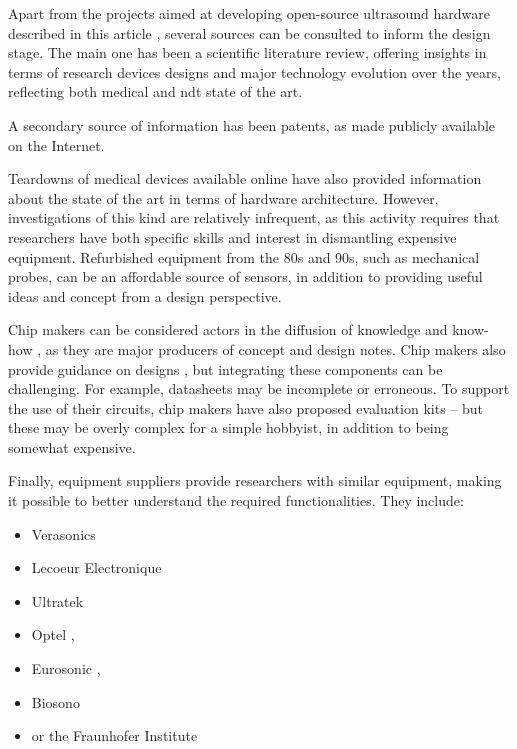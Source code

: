 \documentclass{article}
\begin{document}
Apart from the projects aimed at developing open-source ultrasound hardware described in this article  \cite{roman_open-source_2019, luc_jonveaux_un0rick_2019}, several sources can be consulted to inform the design stage. The main one has been a scientific literature review, offering insights in terms of research devices designs and major technology evolution over the years, reflecting both medical and ndt state of the art.

A secondary source of information has been patents, as made publicly available on the Internet. 

Teardowns of medical devices available online have also provided information about the state of the art in terms of hardware architecture. However, investigations of this kind are relatively infrequent, as this activity requires that researchers have both specific skills and interest in dismantling expensive equipment. Refurbished equipment from the 80s and 90s, such as mechanical probes, can be an affordable source of sensors, in addition to providing useful ideas and concept  from a design perspective.  

Chip makers can be considered actors in the diffusion of knowledge and know-how \cite{brunner_how_2002, xu_challenges_2010}, as they are major producers of concept and design notes. Chip makers also provide guidance on designs \cite{ching_chu_designing_nodate}, but integrating these components can be challenging. For example, datasheets may be incomplete or erroneous. To support the use of their circuits, chip makers have also proposed evaluation kits -- but these may be overly complex for a simple hobbyist, in addition to being somewhat expensive.

Finally, equipment suppliers provide researchers with similar equipment, making it possible to better understand the required functionalities. They include:
\begin{itemize}
\item
Verasonics \cite{peyton_front-end_2017, george_portable_2018, kang_new_2017, hager_ultralight:_2017} 
\item Lecoeur Electronique \cite{lecoeur_bluetooth_nodate, tortoli_ula-op:_2009, zhang_toward_2018, al-aufi_thin_2019}
\item Ultratek \cite{veenstra_generating_nodate, perez-sanchez_numerical_2020, chen_ultrasound_2016, wang_preliminary_2019}
\item Optel \cite{ scholle_pulse_2018, ratajski_application_2017, nowak_evaluation_2020, karjalainen_multi-site_2012},
\item Eurosonic \cite{jin_optimization_2017, mostavi_application_2017, ranachowski_mechanical_2020, vadalma_smartphone_2020}, 
\item Biosono \cite{biosono_sonolab_nodate} 
\item or  the Fraunhofer Institute \cite{zimmermann_highly_2019, zimmermann_miniaturized_2018, zimmermann_high_2018} 
\end{itemize}
\end{document}
